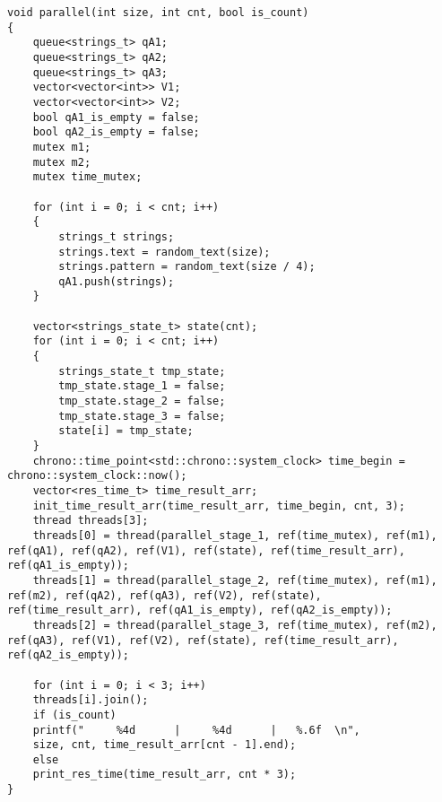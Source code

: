 \begin{center}
\captionsetup{justification=raggedright,singlelinecheck=off}
\begin{lstlisting}[label=lst:parallel_processing,caption=Функция алгоритма конвейерной обработки строки]
void parallel(int size, int cnt, bool is_count)
{
	queue<strings_t> qA1;
	queue<strings_t> qA2;
	queue<strings_t> qA3;
	vector<vector<int>> V1;
	vector<vector<int>> V2;
	bool qA1_is_empty = false;
	bool qA2_is_empty = false;
	mutex m1;
	mutex m2;
	mutex time_mutex;
	
	for (int i = 0; i < cnt; i++)
	{
		strings_t strings;
		strings.text = random_text(size);
		strings.pattern = random_text(size / 4);
		qA1.push(strings);
	}
	
	vector<strings_state_t> state(cnt);
	for (int i = 0; i < cnt; i++)
	{
		strings_state_t tmp_state;
		tmp_state.stage_1 = false;
		tmp_state.stage_2 = false;
		tmp_state.stage_3 = false;
		state[i] = tmp_state;
	}
	chrono::time_point<std::chrono::system_clock> time_begin = chrono::system_clock::now();
	vector<res_time_t> time_result_arr;
	init_time_result_arr(time_result_arr, time_begin, cnt, 3);
	thread threads[3];
	threads[0] = thread(parallel_stage_1, ref(time_mutex), ref(m1), ref(qA1), ref(qA2), ref(V1), ref(state), ref(time_result_arr), ref(qA1_is_empty));
	threads[1] = thread(parallel_stage_2, ref(time_mutex), ref(m1), ref(m2), ref(qA2), ref(qA3), ref(V2), ref(state), ref(time_result_arr), ref(qA1_is_empty), ref(qA2_is_empty));
	threads[2] = thread(parallel_stage_3, ref(time_mutex), ref(m2), ref(qA3), ref(V1), ref(V2), ref(state), ref(time_result_arr), ref(qA2_is_empty));
	
	for (int i = 0; i < 3; i++)
	threads[i].join();
	if (is_count)
	printf("     %4d      |     %4d      |   %.6f  \n",
	size, cnt, time_result_arr[cnt - 1].end);
	else
	print_res_time(time_result_arr, cnt * 3);
}
\end{lstlisting}
\end{center}

\clearpage

